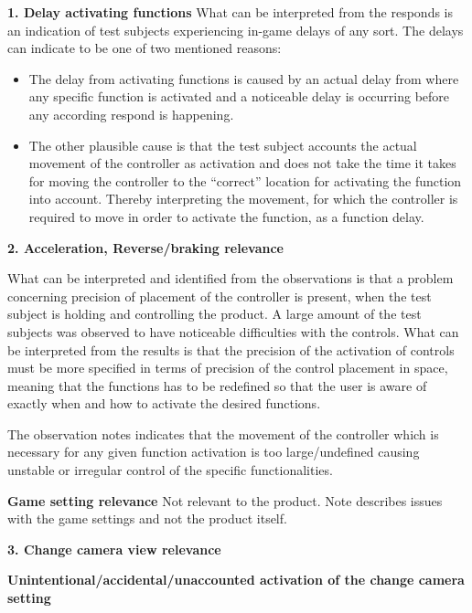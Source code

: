 \noindent\textbf{1. Delay activating functions}\newline
What can be interpreted from the responds is an indication of test subjects experiencing in-game delays of any sort. 
The delays can indicate to be one of two mentioned reasons:
\begin{itemize}
\item The delay from activating functions is caused by an actual delay from where any specific function is activated and a noticeable delay is occurring before any according respond is happening.
\item The other plausible cause is that the test subject accounts the actual movement of the controller as activation and does not take the time it takes for moving the controller to the “correct” location for activating the function into account. Thereby interpreting the movement, for which the controller is required to move in order to activate the function, as a function delay.
\end{itemize}
\bigskip

\noindent\textbf{2. Acceleration, Reverse/braking relevance}\newline


What can be interpreted and identified from the observations is that a problem concerning precision of placement of the controller is present, when the test subject is holding and controlling the product. 
A large amount of the test subjects was observed to have noticeable difficulties with the controls. 
What can be interpreted from the results is that the precision of the activation of controls must be more specified in terms of precision of the control placement in space, meaning that the functions has to be redefined so that the user is aware of exactly when and how to activate the desired functions.


The observation notes indicates that the movement of the controller which is necessary for any given function activation is too large/undefined causing unstable or irregular control of the specific functionalities.
\bigskip

\noindent \textbf{Game setting relevance}\newline
Not relevant to the product. Note describes issues with the game settings and not the product itself.
\bigskip

\noindent\textbf{3. Change camera view relevance}\newline
\bigskip

\noindent \textbf{Unintentional/accidental/unaccounted activation of the change camera setting}\newline


